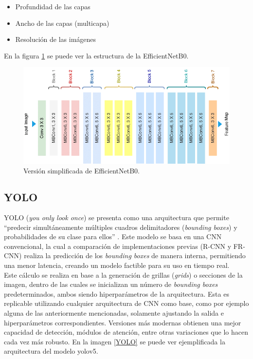 \begin{itemize}
    \item Profundidad de las capas
    \item Ancho de las capas (multicapa)
    \item Resolución de las imágenes
\end{itemize}
En la figura \ref{EfficientNetB0} se puede ver la estructura de la EfficientNetB0. 


\begin{figure}[h!]
\includegraphics[width=1\textwidth]{images/EfficientNetB0.png}
\centering
\caption{Versión simplificada de EfficientNetB0. \cite{EfficientNetB0} }
\label{EfficientNetB0}
\end{figure}

\subsection{YOLO}
YOLO (\textit{you only look once}) se presenta como una arquitectura que permite 
``predecir simultáneamente múltiples cuadros delimitadores (\textit{bounding boxes}) 
y probabilidades de su clase para ellos'' \cite{Redmon2015}. Este modelo se basa en 
una CNN convencional, la cual a comparación de implementaciones previas (R-CNN y FR-CNN) 
realiza la predicción de los \textit{bounding boxes} de manera interna, permitiendo una 
menor latencia, creando un modelo factible para su uso en tiempo real.\\

Este cálculo se realiza en base a la generación de grillas (\textit{grids}) o secciones 
de la imagen, dentro de las cuales se inicializan un número de \textit{bounding boxes} 
predeterminados, ambos siendo hiperparámetros de la arquitectura. Esta es replicable 
utilizando cualquier arquitectura de CNN como base, como por ejemplo alguna de las 
anteriormente mencionadas, solamente ajustando la salida e hiperparámetros correspondientes. 
Versiones más modernas obtienen una mejor capacidad de detección, módulos de atención, 
entre otras variaciones que lo hacen cada vez más robusto. En la imagen \ref{YOLO} se 
puede ver ejemplificada la arquitectura del modelo yolov5.

